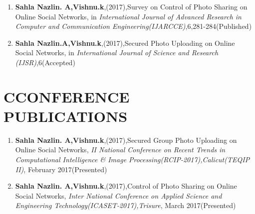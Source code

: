 \begin{publications}
\begin{enumerate}
\item  \textbf{Sahla Nazlin. A,Vishnu.k},(2017),Survey on Control of Photo Sharing on Online Social Networks, in \textit{International Journal of Advanced Research in Computer and Communication Engineering(IJARCCE)},6,281-284(Published)

\item  \textbf{Sahla Nazlin.A,Vishnu.k},(2017),Secured Photo Uploading on Online Social Networks, in \textit{International Journal of Science and Research (IJSR)},6(Accepted)
 \end{enumerate}
%
%
\section*{\fontsize{12}CCONFERENCE PUBLICATIONS}
\begin{enumerate}

\item  \textbf{Sahla Nazlin. A,Vishnu.k},(2017),Secured Group Photo Uploading on Online Social Networks, \textit{II National    Conference  on Recent Trends in  Computational Intelligence & Image Processing(RCIP-2017),Calicut(TEQIP II)}, February 2017(Presented)
\item  \textbf{Sahla Nazlin. A,Vishnu.k},(2017),Control of Photo Sharing on Online Social Networks, \textit{Inter National    Conference  on Applied Science and Engineering Technology(ICASET-2017),Trisure}, March 2017(Presented)


\end{enumerate}
\end{publications}
